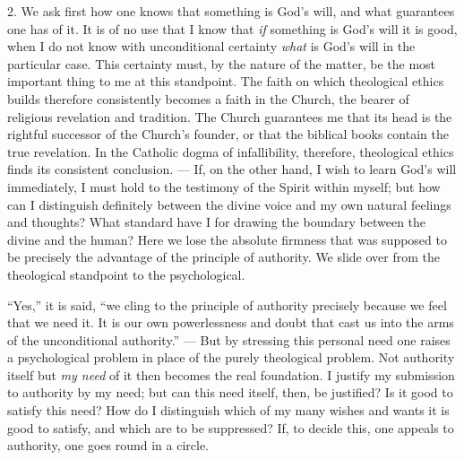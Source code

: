 \documentclass[12pt,a4paper,openany]{book}
\begin{document}
2. We ask first how one knows that something is God's will, and what guarantees one has of it. It
is of no use that I know that \textit{if} something is God's will it is good, when I do not know
with unconditional certainty \textit{what} is God's will in the particular case. This certainty must,
by the nature of the matter, be the most important thing to me at this standpoint. The faith on
which theological ethics builds therefore consistently becomes a faith in the Church, the bearer of
religious revelation and tradition. The Church guarantees me that its head is the rightful successor
of the Church's founder, or that the biblical books contain the true revelation. In the Catholic
dogma of infallibility, therefore, theological ethics finds its consistent conclusion. --- If, on
the other hand, I wish to learn God's will immediately, I must hold to the testimony of the Spirit
within myself; but how can I distinguish definitely between the divine voice and my own natural
feelings and thoughts? What standard have I for drawing the boundary between the divine and the
human? Here we lose the absolute firmness that was supposed to be precisely the advantage of the
principle of authority. We slide over from the theological standpoint to the psychological.

``Yes,'' it is said, ``we cling to the principle of authority precisely because we feel that we need
it. It is our own powerlessness and doubt that cast us into the arms of the unconditional
authority.'' --- But by stressing this personal need one raises a psychological problem in place of
the purely theological problem. Not authority itself but \textit{my need} of it then becomes the real
foundation. I justify my submission to authority by my need; but can this need itself, then, be
justified? Is it good to satisfy this need? How do I distinguish which of my many wishes and wants it
is good to satisfy, and which are to be suppressed? If, to decide this, one appeals to authority, one
goes round in a circle.
\end{document}
